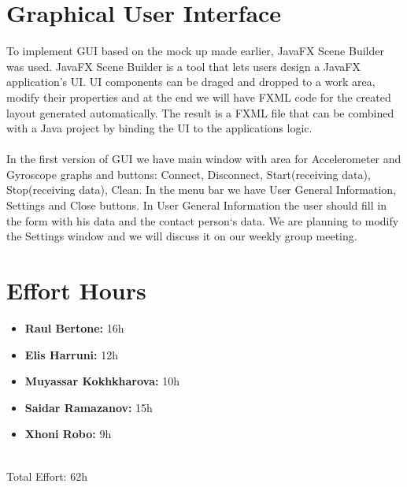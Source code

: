 \documentclass[12pt]{article}
\begin{document}
\section{Graphical User Interface} 
To implement GUI based on the mock up made earlier, JavaFX Scene Builder\cite{JavaFX} was used. JavaFX Scene Builder is a tool that lets users design a JavaFX application's UI. UI components can be draged and dropped to a work area, modify their properties and at the end we will have FXML code for the created layout generated automatically. The result is a FXML file that can be combined with a Java project by binding the UI to the applications logic. \\\\
In the first version of GUI we have main window with area for Accelerometer and Gyroscope graphs and buttons: Connect, Disconnect, Start(receiving data), Stop(receiving data), Clean. In the menu bar we have User General Information, Settings and Close buttons. In User General Information the user should fill in the form with his data and the contact person`s data. We are planning to modify the Settings window and we will discuss it on our weekly group meeting.

\section{Effort Hours}
\begin{itemize}
	\item \textbf{Raul Bertone:} 16h
	\item \textbf{Elis Harruni:} 12h
	\item \textbf{Muyassar Kokhkharova:} 10h
	\item \textbf{Saidar Ramazanov:} 15h
	\item \textbf{Xhoni Robo:} 9h\\\\
\end{itemize}

Total Effort: 62h
\printbibliography
\end{document}
